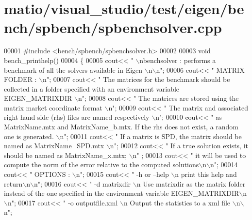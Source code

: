 \hypertarget{matio_2visual__studio_2test_2eigen_2bench_2spbench_2spbenchsolver_8cpp_source}{}\section{matio/visual\+\_\+studio/test/eigen/bench/spbench/spbenchsolver.cpp}
\label{matio_2visual__studio_2test_2eigen_2bench_2spbench_2spbenchsolver_8cpp_source}

\begin{DoxyCode}
00001 \textcolor{preprocessor}{#include <bench/spbench/spbenchsolver.h>}
00002 
00003 \textcolor{keywordtype}{void} bench\_printhelp()
00004 \{
00005     cout<< \textcolor{stringliteral}{" \(\backslash\)nbenchsolver : performs a benchmark of all the solvers available in Eigen \(\backslash\)n\(\backslash\)n"};
00006     cout<< \textcolor{stringliteral}{" MATRIX FOLDER : \(\backslash\)n"};
00007     cout<< \textcolor{stringliteral}{" The matrices for the benchmark should be collected in a folder specified with an environment
       variable EIGEN\_MATRIXDIR \(\backslash\)n"};
00008     cout<< \textcolor{stringliteral}{" The matrices are stored using the matrix market coordinate format \(\backslash\)n"};
00009     cout<< \textcolor{stringliteral}{" The matrix and associated right-hand side (rhs) files are named respectively \(\backslash\)n"};
00010     cout<< \textcolor{stringliteral}{" as MatrixName.mtx and MatrixName\_b.mtx. If the rhs does not exist, a random one is generated. 
      \(\backslash\)n"};
00011     cout<< \textcolor{stringliteral}{" If a matrix is SPD, the matrix should be named as MatrixName\_SPD.mtx \(\backslash\)n"};
00012     cout<< \textcolor{stringliteral}{" If a true solution exists, it should be named as MatrixName\_x.mtx; \(\backslash\)n"}     ;
00013     cout<< \textcolor{stringliteral}{" it will be used to compute the norm of the error relative to the computed solutions\(\backslash\)n\(\backslash\)n"};
00014     cout<< \textcolor{stringliteral}{" OPTIONS : \(\backslash\)n"}; 
00015     cout<< \textcolor{stringliteral}{" -h or --help \(\backslash\)n    print this help and return\(\backslash\)n\(\backslash\)n"};
00016     cout<< \textcolor{stringliteral}{" -d matrixdir \(\backslash\)n    Use matrixdir as the matrix folder instead of the one specified in the
       environment variable EIGEN\_MATRIXDIR\(\backslash\)n\(\backslash\)n"}; 
00017     cout<< \textcolor{stringliteral}{" -o outputfile.xml \(\backslash\)n    Output the statistics to a xml file \(\backslash\)n\(\backslash\)n"};

\end{DoxyCode}
